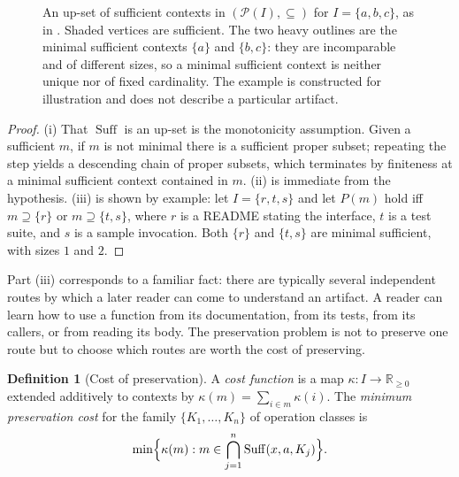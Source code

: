 \documentclass[11pt,twoside,openright]{book}
\theoremstyle{plain}
\theoremstyle{definition}
\newtheorem{definition}[theorem]{Definition}
\theoremstyle{remark}
\newcommand{\Suff}{\operatorname{Suff}}
\newcommand{\Pow}{\mathcal{P}}
\begin{document}
\begin{figure}[t]
\centering
{}
\caption{An up-set of sufficient contexts in $(\Pow(I),\subseteq)$ for $I=\{a,b,c\}$, as in . Shaded vertices are sufficient. The two heavy outlines are the minimal sufficient contexts $\{a\}$ and $\{b,c\}$: they are incomparable and of different sizes, so a minimal sufficient context is neither unique nor of fixed cardinality. The example is constructed for illustration and does not describe a particular artifact.}
\label{fig:suffcontexts}
\end{figure}


\begin{proof}
(i) That $\Suff$ is an up-set is the monotonicity assumption. Given a sufficient $m$, if $m$ is not minimal there is a sufficient proper subset; repeating the step yields a descending chain of proper subsets, which terminates by finiteness at a minimal sufficient context contained in $m$. (ii) is immediate from the hypothesis. (iii) is shown by example: let $I=\{r,t,s\}$ and let $P(m)$ hold iff $m\supseteq\{r\}$ or $m\supseteq\{t,s\}$, where $r$ is a README stating the interface, $t$ is a test suite, and $s$ is a sample invocation. Both $\{r\}$ and $\{t,s\}$ are minimal sufficient, with sizes $1$ and $2$.
\end{proof}

Part (iii) corresponds to a familiar fact: there are typically several independent routes by which a later reader can come to understand an artifact. A reader can learn how to use a function from its documentation, from its tests, from its callers, or from reading its body. The preservation problem is not to preserve one route but to choose which routes are worth the cost of preserving.

\begin{definition}[Cost of preservation]\label{def:preservecost}
A \emph{cost function} is a map $\kappa:I\to\mathbb{R}_{\ge0}$ extended additively to contexts by $\kappa(m)=\sum_{i\in m}\kappa(i)$. The \emph{minimum preservation cost} for the family $\{K_1,\dots,K_n\}$ of operation classes is
\[
\min\Bigl\{\kappa(m):m\in\bigcap_{j=1}^{n}\Suff(x,a,K_j)\Bigr\}.
\]
\end{definition}
\end{document}
